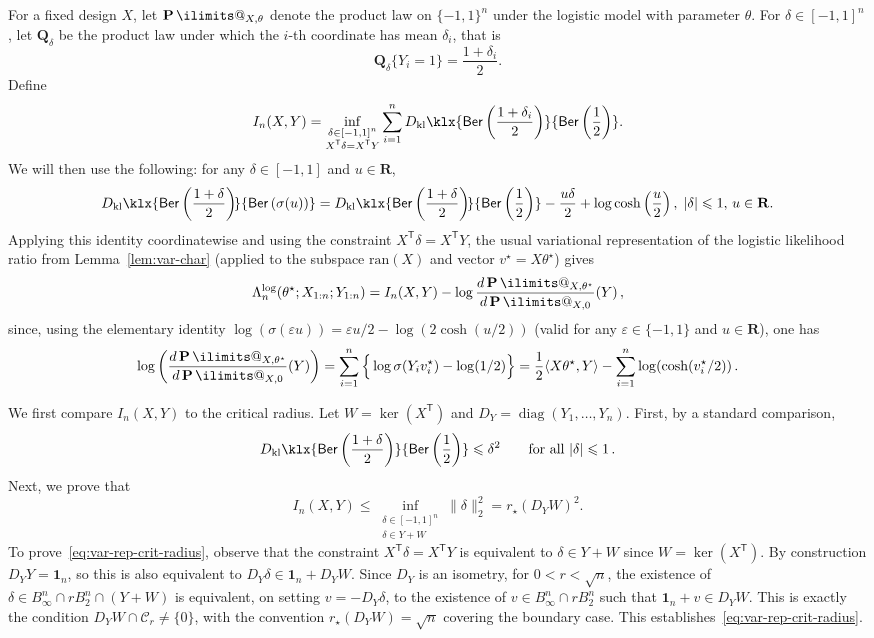 \documentclass[11pt, letterpaper, hidelinks]{article}
\makeatletter
\renewcommand{\proofname}{\textit{\textbf{Proof}}}
\renewenvironment{proof}[1][\proofname]{\par\pushQED{\qed}\normalfont \topsep6\p@\@plus6\p@\relax\trivlist\item[\hskip\labelsep#1\@addpunct{}]\ignorespaces}{\popQED\endtrivlist\@endpefalse}
\newcommand{\R}{\mathbf R}
\newcommand{\Q}{\mathbf Q}
\newcommand{\1}{\mathbf 1}
\newcommand{\eps}{\varepsilon}
\renewcommand{\leq}{\leqslant}
\newcommand{\T}{\mathsf{T}}
\newcommand{\kl}{D_{\rm kl}\klx}
\renewcommand{\P}{\operatorname*{\mathbf{P}}\ilimits@}
\theoremstyle{plain}
\theoremstyle{definition}
\newcommand{\thetastar}{\theta^\star}
\let\top\T
\newcommand{\defn}{=}
\newcommand{\Ber}[1]{\mathsf{Ber}\left(#1\right)}
\newcommand{\ran}{\mathrm{ran}}
\makeatother
\begin{document}
\begin{proof}
For a fixed design \(X\), let \(\P_{X,\theta}\) denote the product law on
\(\{-1,1\}^n\) under the logistic model with parameter \(\theta\). For
\(\delta\in[-1,1]^n\), let \(\Q_\delta\) be the product law under which the
\(i\)-th coordinate has mean \(\delta_i\), that is
\[
\Q_\delta\{Y_i=1\}=\frac{1+\delta_i}{2}.
\]
Define
\[
I_n(X,Y)
\defn
\inf_{\substack{\delta\in[-1,1]^n\\ X^\T\delta=X^\T Y}}
\sum_{i=1}^n
\kl{\Ber{\frac{1+\delta_i}{2}}}{\Ber{\frac12}} .
\]
We will then use the following: for any $\delta \in [-1,1]$ and $u \in \R$,
\[
\kl{\Ber{\frac{1+\delta}{2}} \! }{\Ber{\sigma(u)}}
=
\kl{\Ber{\frac{1+\delta}{2}} \! }{\Ber{\frac12}}
-\frac{u\delta}2
+\log\cosh\left(\frac u2\right),
\; |\delta|\leq 1, \, u\in\R.
\]
Applying this identity coordinatewise and using the constraint \(X^\T\delta=X^\T Y\), the usual variational representation of the logistic
likelihood ratio from Lemma~\ref{lem:var-char} (applied to the subspace $\ran(X)$ and vector $v^\star = X \thetastar$) gives
\begin{equation}
\label{eq:ll-var-kl}
\Lambda_n^{\operatorname{log}}(\thetastar;X_{1:n};Y_{1:n})
	= I_n(X,Y) - \log\frac{d\P_{X,\thetastar}}{d\P_{X,0}}(Y) \, ,
\end{equation}
since, using the elementary identity $\log(\sigma(\eps u)) = \eps u/2 - \log(2 \cosh(u/2))$ (valid for any $\eps \in	\{-1,1\}$ and $u\in \R$), one has
\[
\log\bigg(\frac{d\P_{X,\thetastar}}{d\P_{X,0}}(Y)\bigg)
	=  \sum_{i=1}^{n} \Big\{ \log \sigma(Y_i v^\star_i) - \log(1/2) \Big\}
	=\frac 1 2 \langle X \thetastar, Y \rangle -   \sum_{i=1}^{n} \log(\cosh(v^\star_i /2)) \, .
\]

We first compare $I_n(X,Y)$ to the critical radius. Let
$W=\ker(X^\T)$ and $D_Y=\operatorname{diag}(Y_1,\ldots,Y_n)$.
First, by a standard comparison, 
\[
\kl{\Ber{\frac{1+\delta}{2}}}{\Ber{\frac12}} \leq \delta^2
\qquad\textrm{for all } |\delta| \leq 1 \, .
\]
Next, we prove that
\begin{equation}
\label{eq:var-rep-crit-radius}
I_n(X,Y)
	\leq \inf_{\substack{\delta\in[-1,1]^n\\ \delta\in Y+W}} \|\delta\|_2^2
	= r_\star(D_YW)^2.
\end{equation}
To prove~\eqref{eq:var-rep-crit-radius}, observe that the constraint $X^\top \delta = X^\top Y$ is equivalent to $\delta \in Y + W$ since $W = \ker(X^\top)$. By construction $D_Y Y = \1_n$, so this is also equivalent to $D_Y \delta \in \1_n + D_Y W$. Since $D_Y$ is an isometry, for $0<r<\sqrt n$, the existence of
$\delta\in B_\infty^n\cap rB_2^n\cap(Y+W)$ is equivalent, on setting
$v=-D_Y\delta$, to the existence of $v\in B_\infty^n\cap rB_2^n$ such that
$\1_n+v\in D_YW$. This is exactly
the condition $D_YW\cap\mathcal C_r\neq\{0\}$, with the convention
$r_\star(D_YW)=\sqrt n$ covering the boundary case. This establishes~\eqref{eq:var-rep-crit-radius}.


\end{proof}
\end{document}
